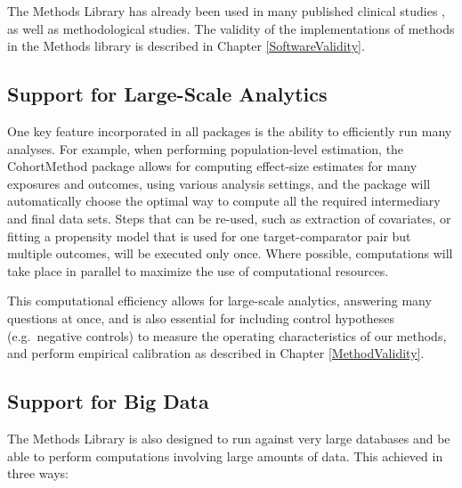 \documentclass[11pt]{book}
\theoremstyle{definition}
\theoremstyle{definition}
\theoremstyle{definition}
\theoremstyle{remark}
\begin{document}
The Methods Library has already been used in many published clinical
studies
\citep{boland_2017, duke_2017, ramcharran_2017, weinstein_2017, wang_2017, ryan_2017, ryan_2018, vashisht_2018, yuan_2018, johnston_2019},
as well as methodological studies.
\citep{schuemie_2014, schuemie_2016, reps2018, tian_2018, schuemie_2018, schuemie_2018b, reps_2019}
The validity of the implementations of methods in the Methods library is
described in Chapter \ref{SoftwareValidity}.

\subsection{Support for Large-Scale
Analytics}\label{support-for-large-scale-analytics}

One key feature incorporated in all packages is the ability to
efficiently run many analyses. For example, when performing
population-level estimation, the CohortMethod package allows for
computing effect-size estimates for many exposures and outcomes, using
various analysis settings, and the package will automatically choose the
optimal way to compute all the required intermediary and final data
sets. Steps that can be re-used, such as extraction of covariates, or
fitting a propensity model that is used for one target-comparator pair
but multiple outcomes, will be executed only once. Where possible,
computations will take place in parallel to maximize the use of
computational resources.

This computational efficiency allows for large-scale analytics,
answering many questions at once, and is also essential for including
control hypotheses (e.g.~negative controls) to measure the operating
characteristics of our methods, and perform empirical calibration as
described in Chapter \ref{MethodValidity}. 

\subsection{Support for Big Data}\label{BigDataSupport}

The Methods Library is also designed to run against very large databases
and be able to perform computations involving large amounts of data.
This achieved in three ways:
\end{document}
